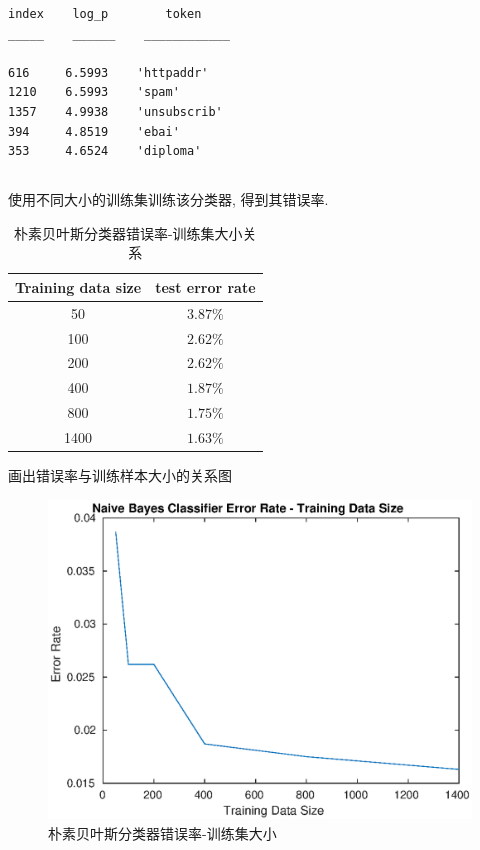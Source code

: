 \documentclass{ctexart}
\begin{document}
\begin{verbatim}
index    log_p        token    
_____    ______    ____________

616     6.5993    'httpaddr'  
1210    6.5993    'spam'      
1357    4.9938    'unsubscrib'
394     4.8519    'ebai'      
353     4.6524    'diploma'  
\end{verbatim}

\subsection{}

使用不同大小的训练集训练该分类器, 得到其错误率.
\begin{table}[ht]
	\centering
	\begin{tabular}{|c|c|}
		\hline
		Training data size & test error rate \\
		\hline
		50 & $3.87\%$\\
		100 & $2.62\%$\\
		200 & $2.62\%$\\
		400 & $1.87\%$\\
		800 & $1.75\%$\\
		1400 & $1.63\%$\\
		\hline
	\end{tabular}
	\caption{朴素贝叶斯分类器错误率-训练集大小关系}
\end{table}

画出错误率与训练样本大小的关系图

\begin{figure}
	\centering
	\includegraphics[scale = 1]{nb_error.eps}
	\caption{朴素贝叶斯分类器错误率-训练集大小}
\end{figure}
\end{document}
